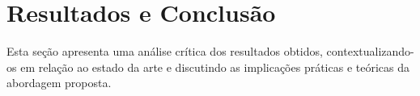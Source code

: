 \section{Resultados e Conclusão}
\label{sec:resultados}

Esta seção apresenta uma análise crítica dos resultados obtidos, contextualizando-os em relação ao estado da arte e discutindo as implicações práticas e teóricas da abordagem proposta.